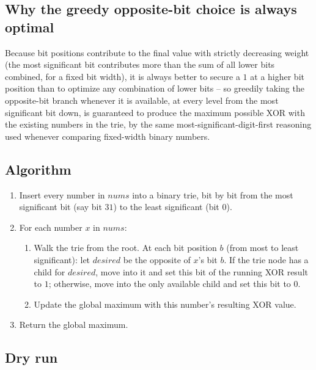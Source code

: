 \subsection*{Why the greedy opposite-bit choice is always optimal}

Because bit positions contribute to the final value with strictly
decreasing weight (the most significant bit contributes more than the
sum of all lower bits combined, for a fixed bit width), it is always
better to secure a $1$ at a higher bit position than to optimize any
combination of lower bits -- so greedily taking the opposite-bit branch
whenever it is available, at every level from the most significant bit
down, is guaranteed to produce the maximum possible XOR with the
existing numbers in the trie, by the same most-significant-digit-first
reasoning used whenever comparing fixed-width binary numbers.

\subsection*{Algorithm}

\begin{enumerate}
  \item Insert every number in $\textit{nums}$ into a binary trie, bit
        by bit from the most significant bit (say bit $31$) to the
        least significant (bit $0$).
  \item For each number $x$ in $\textit{nums}$:
  \begin{enumerate}
    \item Walk the trie from the root. At each bit position $b$ (from
          most to least significant): let $\textit{desired}$ be the
          opposite of $x$'s bit $b$. If the trie node has a child for
          $\textit{desired}$, move into it and set this bit of the
          running XOR result to $1$; otherwise, move into the only
          available child and set this bit to $0$.
    \item Update the global maximum with this number's resulting XOR
          value.
  \end{enumerate}
  \item Return the global maximum.
\end{enumerate}

\subsection*{Dry run}


